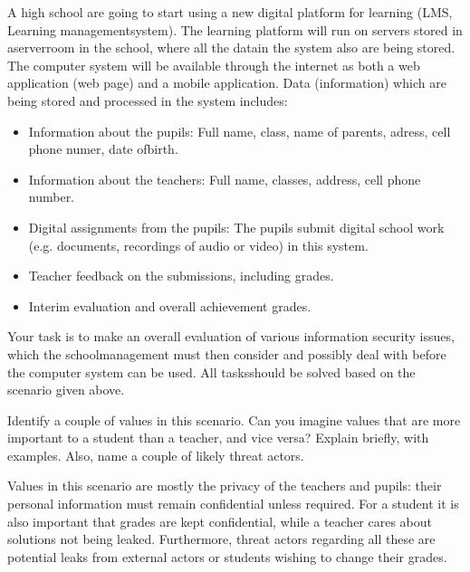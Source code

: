 \documentclass{myassignment}
\begin{document}
	\begin{problem}
		A high school are going to start using a new digital platform for learning (LMS, Learning managementsystem). The learning platform will run on servers stored in aserverroom in the school, where all the datain the system also are being stored. The computer system will be available through the internet as both a web application (web page) and a mobile application. Data (information) which are being stored and processed in the system includes:%
		\begin{itemize}%
			\item Information about the pupils: Full name, class, name of parents, adress, cell phone numer, date ofbirth.%
			\item Information about the teachers: Full name, classes, address, cell phone number.%
			\item Digital assignments from the pupils: The pupils submit digital school work (e.g. documents, recordings of audio or video) in this system.%
			\item Teacher feedback on the submissions, including grades.%
			\item Interim evaluation and overall achievement grades.%
		\end{itemize}
		Your task is to make an overall evaluation of various information security issues, which the schoolmanagement must then consider and possibly deal with before the computer system can be used. All tasksshould be solved based on the scenario given above.
	\end{problem}

	\begin{problem}
		Identify a couple of values in this scenario. Can you imagine values that are more important to a student than a teacher, and vice versa? Explain briefly, with examples. Also, name a couple of likely threat actors.%
	\end{problem}

	\begin{answer}
		Values in this scenario are mostly the privacy of the teachers and pupils: their personal information must remain confidential unless required. For a student it is also important that grades are kept confidential, while a teacher cares about solutions not being leaked. Furthermore, threat actors regarding all these are potential leaks from external actors or students wishing to change their grades. %
	\end{answer}
\end{document}

